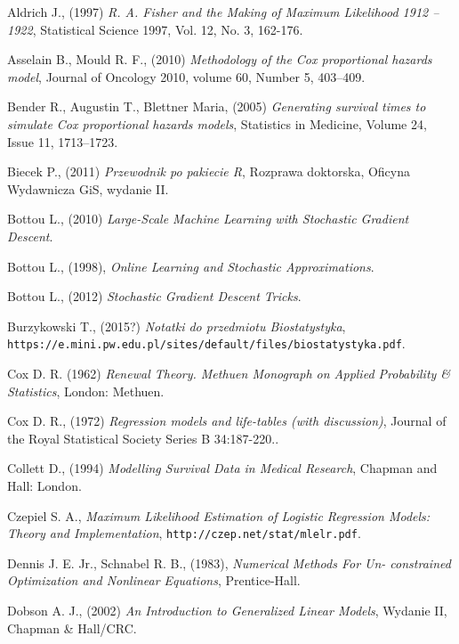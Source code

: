 \begin{thebibliography}{99}

 Aldrich J., (1997) \textit{R. A. Fisher and the Making of Maximum Likelihood 1912 – 1922}, Statistical Science
1997, Vol. 12, No. 3, 162-176.

 Asselain B., Mould R. F., (2010) \textit{Methodology of the Cox proportional hazards model},  Journal of Oncology 2010, volume 60, Number 5,  403–409.

 Bender R., Augustin T., Blettner Maria, (2005) \textit{Generating survival times to simulate Cox proportional hazards models}, Statistics in Medicine, Volume 24, Issue 11, 1713–1723.

 Biecek P., (2011) \textit{Przewodnik po pakiecie R}, Rozprawa doktorska, Oficyna Wydawnicza GiS, wydanie II.

 Bottou L., (2010) \textit{Large-Scale Machine Learning with Stochastic Gradient Descent}.

 Bottou L., (1998), \textit{Online Learning and Stochastic
Approximations}.


 Bottou L., (2012) \textit{Stochastic Gradient Descent Tricks}.

 Burzykowski T., (2015?) \textit{Notatki do przedmiotu Biostatystyka}, \texttt{https://e.mini.pw.edu.pl/sites/default/files/biostatystyka.pdf}.

 Cox D. R. (1962) \textit{Renewal Theory. Methuen Monograph on Applied Probability
\& Statistics}, London: Methuen.

  Cox D. R., (1972) \textit{Regression models and life-tables (with discussion)}, Journal of the Royal Statistical Society Series B 34:187-220.. 


 Collett D., (1994) \textit{Modelling Survival Data in Medical Research}, Chapman and Hall:
London.

 Czepiel S. A., \textit{Maximum Likelihood Estimation of Logistic Regression Models: Theory and Implementation}, \texttt{http://czep.net/stat/mlelr.pdf}.

 Dennis J. E. Jr., Schnabel R. B., (1983), \textit{Numerical Methods For Un-
constrained Optimization and Nonlinear Equations}, Prentice-Hall.

 Dobson A. J., (2002) \textit{An Introduction to Generalized Linear Models}, Wydanie II, Chapman \& Hall/CRC.


\end{thebibliography}
